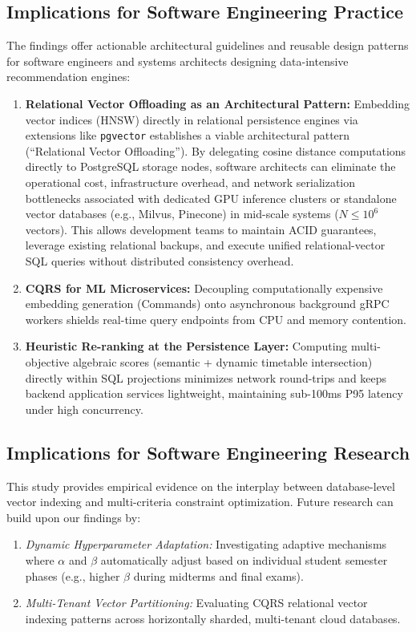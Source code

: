 \documentclass[a4paper,fleqn]{cas-dc}
\begin{document}
\subsection{Implications for Software Engineering Practice}
The findings offer actionable architectural guidelines and reusable design patterns for software engineers and systems architects designing data-intensive recommendation engines:
\begin{enumerate}
    \item \textbf{Relational Vector Offloading as an Architectural Pattern:} Embedding vector indices (HNSW) directly in relational persistence engines via extensions like \texttt{pgvector} establishes a viable architectural pattern (``Relational Vector Offloading''). By delegating cosine distance computations directly to PostgreSQL storage nodes, software architects can eliminate the operational cost, infrastructure overhead, and network serialization bottlenecks associated with dedicated GPU inference clusters or standalone vector databases (e.g., Milvus, Pinecone) in mid-scale systems ($N \le 10^6$ vectors). This allows development teams to maintain ACID guarantees, leverage existing relational backups, and execute unified relational-vector SQL queries without distributed consistency overhead.
    \item \textbf{CQRS for ML Microservices:} Decoupling computationally expensive embedding generation (Commands) onto asynchronous background gRPC workers shields real-time query endpoints from CPU and memory contention.
    \item \textbf{Heuristic Re-ranking at the Persistence Layer:} Computing multi-objective algebraic scores (semantic + dynamic timetable intersection) directly within SQL projections minimizes network round-trips and keeps backend application services lightweight, maintaining sub-100ms P95 latency under high concurrency.
\end{enumerate}

\subsection{Implications for Software Engineering Research}
This study provides empirical evidence on the interplay between database-level vector indexing and multi-criteria constraint optimization. Future research can build upon our findings by:
\begin{enumerate}
    \item \textit{Dynamic Hyperparameter Adaptation:} Investigating adaptive mechanisms where $\alpha$ and $\beta$ automatically adjust based on individual student semester phases (e.g., higher $\beta$ during midterms and final exams).
    \item \textit{Multi-Tenant Vector Partitioning:} Evaluating CQRS relational vector indexing patterns across horizontally sharded, multi-tenant cloud databases.
\end{enumerate}
\end{document}
